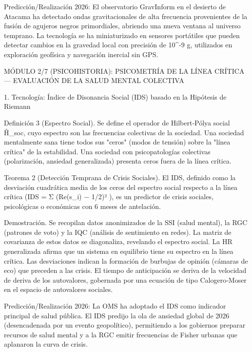 \documentclass[12pt,a4paper]{book}
\begin{document}
Predicción/Realización 2026: El observatorio GravInform en el desierto de Atacama ha detectado ondas gravitacionales de alta frecuencia provenientes de la fusión de agujeros negros primordiales, abriendo una nueva ventana al universo temprano. La tecnología se ha miniaturizado en sensores portátiles que pueden detectar cambios en la gravedad local con precisión de 10^{-9} g, utilizados en exploración geofísica y navegación inercial sin GPS.

MÓDULO 2/7 (PSICOHISTORIA): PSICOMETRÍA DE LA LÍNEA CRÍTICA — EVALUACIÓN DE LA SALUD MENTAL COLECTIVA

1. Tecnología: Índice de Disonancia Social (IDS) basado en la Hipótesis de Riemann

Definición 3 (Espectro Social). Se define el operador de Hilbert‑Pólya social Ĥ_soc, cuyo espectro son las frecuencias colectivas de la sociedad. Una sociedad mentalmente sana tiene todos sus "ceros" (modos de tensión) sobre la "línea crítica" de la estabilidad. Una sociedad con psicopatologías colectivas (polarización, ansiedad generalizada) presenta ceros fuera de la línea crítica.

Teorema 2 (Detección Temprana de Crisis Sociales). El IDS, definido como la desviación cuadrática media de los ceros del espectro social respecto a la línea crítica (IDS = Σ (Re(s_i) − 1/2)² ), es un predictor de crisis sociales, psicológicas o económicas con 6 meses de antelación.

Demostración. Se recopilan datos anonimizados de la SSI (salud mental), la RGC (patrones de voto) y la IQC (análisis de sentimiento en redes). La matriz de covarianza de estos datos se diagonaliza, revelando el espectro social. La HR generalizada afirma que un sistema en equilibrio tiene su espectro en la línea crítica. Las desviaciones indican la formación de burbujas de opinión (cámaras de eco) que preceden a las crisis. El tiempo de anticipación se deriva de la velocidad de deriva de los autovalores, gobernada por una ecuación de tipo Calogero‑Moser en el espacio de autovalores sociales.

Predicción/Realización 2026: La OMS ha adoptado el IDS como indicador principal de salud pública. El IDS predijo la ola de ansiedad global de 2026 (desencadenada por un evento geopolítico), permitiendo a los gobiernos preparar recursos de salud mental y a la RGC emitir frecuencias de Fisher urbanas que aplanaron la curva de crisis.
\end{document}
